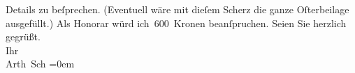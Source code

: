 \begin{ledgroupsized}[t]{13cm}
               Details zu beſprechen. (Eventuell wäre mit dieſem Scherz die ganze Oſterbeilage ausgefüllt.) Als Honorar würd
               ich 600 Kronen beanſpruchen.\pend
           \pstart
           Seien Sie herzlich gegrüßt. {\\[\baselineskip]}Ihr {\\[\baselineskip]}\spacefill\mbox{Arth Sch}\pend
           \leftskip=0em{}
         
         \endnumbering{}\end{ledgroupsized}  \newcommand{\dateiname}{L02997}\newcommand{\titel}{Arthur Schnitzler an Felix Salten, 8. 2. 1905}\newcommand{\editorInnen}{Martin Anton Müller und Laura Untner}
      